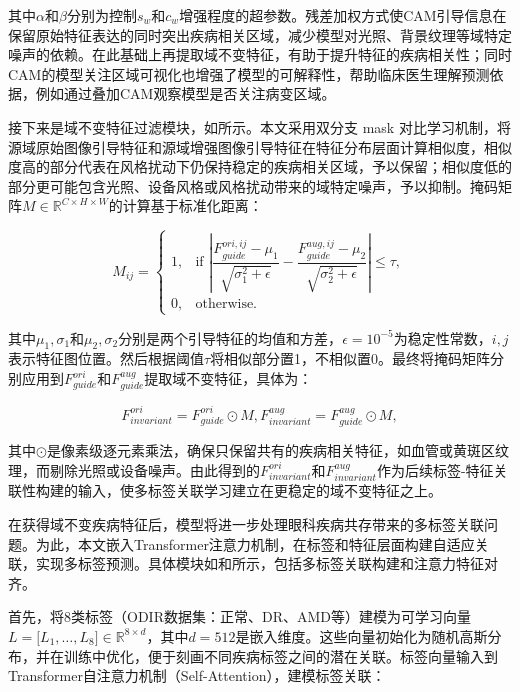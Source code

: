 其中\(\alpha\)和\(\beta\)分别为控制\(s_{w}\)和\(c_{w}\)增强程度的超参数。残差加权方式使CAM引导信息在保留原始特征表达的同时突出疾病相关区域，减少模型对光照、背景纹理等域特定噪声的依赖。在此基础上再提取域不变特征，有助于提升特征的疾病相关性；同时CAM的模型关注区域可视化也增强了模型的可解释性，帮助临床医生理解预测依据，例如通过叠加CAM观察模型是否关注病变区域。

接下来是域不变特征过滤模块，如所示。本文采用双分支 mask 对比学习机制，将源域原始图像引导特征和源域增强图像引导特征在特征分布层面计算相似度，相似度高的部分代表在风格扰动下仍保持稳定的疾病相关区域，予以保留；相似度低的部分更可能包含光照、设备风格或风格扰动带来的域特定噪声，予以抑制。掩码矩阵\(M \in \mathbb{R}^{C \times H \times W}\)的计算基于标准化距离：

\[
M_{ij} =
\left\{
\begin{array}{ll}
1, & \text{if } \left| \dfrac{F_{guide}^{ori,ij} - \mu_{1}}{\sqrt{\sigma_{1}^{2} + \epsilon}} - \dfrac{F_{guide}^{aug,ij} - \mu_{2}}{\sqrt{\sigma_{2}^{2} + \epsilon}} \right| \leq \tau, \\
0, & \text{otherwise.}
\end{array}
\right.
\]

其中\(\mu_{1},\sigma_{1}\)和\(\mu_{2},\sigma_{2}\)分别是两个引导特征的均值和方差，\(\epsilon = 10^{-5}\)为稳定性常数，\(i,j\)表示特征图位置。然后根据阈值\(\tau\)将相似部分置1，不相似置0。最终将掩码矩阵分别应用到\(F_{guide}^{ori}\)和\(F_{guide}^{aug}\)提取域不变特征，具体为：

\[F_{invariant}^{ori} = F_{guide}^{ori} \odot M,F_{invariant}^{aug} = F_{guide}^{aug} \odot M,
\]

其中\(\odot\)是像素级逐元素乘法，确保只保留共有的疾病相关特征，如血管或黄斑区纹理，而剔除光照或设备噪声。由此得到的\(F_{invariant}^{ori}\)和\(F_{invariant}^{aug}\)作为后续标签-特征关联性构建的输入，使多标签关联学习建立在更稳定的域不变特征之上。


在获得域不变疾病特征后，模型将进一步处理眼科疾病共存带来的多标签关联问题。为此，本文嵌入Transformer注意力机制，在标签和特征层面构建自适应关联，实现多标签预测。具体模块如和所示，包括多标签关联构建和注意力特征对齐。

首先，将8类标签（ODIR数据集：正常、DR、AMD等）建模为可学习向量\(L = \lbrack L_{1},\ldots,L_{8}\rbrack \in \mathbb{R}^{8 \times d}\)，其中\(d = 512\)是嵌入维度。这些向量初始化为随机高斯分布，并在训练中优化，便于刻画不同疾病标签之间的潜在关联。标签向量输入到Transformer自注意力机制（Self-Attention），建模标签关联：

